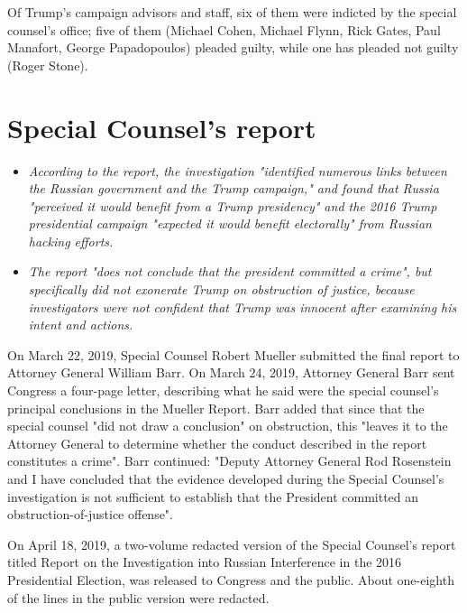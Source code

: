 Of Trump's campaign advisors and staff, six of them were indicted by the
special counsel's office; five of them (Michael Cohen, Michael Flynn,
Rick Gates, Paul Manafort, George Papadopoulos) pleaded guilty, while
one has pleaded not guilty (Roger Stone).

\section{Special Counsel's report}\label{special-counsels-report}

\begin{itemize}
\item
  \emph{According to the report, the investigation "identified numerous
  links between the Russian government and the Trump campaign," and
  found that Russia "perceived it would benefit from a Trump presidency"
  and the 2016 Trump presidential campaign "expected it would benefit
  electorally" from Russian hacking efforts.}
\item
  \emph{The report "does not conclude that the president committed a
  crime", but specifically did not exonerate Trump on obstruction of
  justice, because investigators were not confident that Trump was
  innocent after examining his intent and actions.}
\end{itemize}

On March 22, 2019, Special Counsel Robert Mueller submitted the final
report to Attorney General William Barr. On March 24, 2019, Attorney
General Barr sent Congress a four-page letter, describing what he said
were the special counsel's principal conclusions in the Mueller Report.
Barr added that since that the special counsel "did not draw a
conclusion" on obstruction, this "leaves it to the Attorney General to
determine whether the conduct described in the report constitutes a
crime". Barr continued: "Deputy Attorney General Rod Rosenstein and I
have concluded that the evidence developed during the Special Counsel's
investigation is not sufficient to establish that the President
committed an obstruction-of-justice offense".

On April 18, 2019, a two-volume redacted version of the Special
Counsel's report titled Report on the Investigation into Russian
Interference in the 2016 Presidential Election, was released to Congress
and the public. About one-eighth of the lines in the public version were
redacted.


